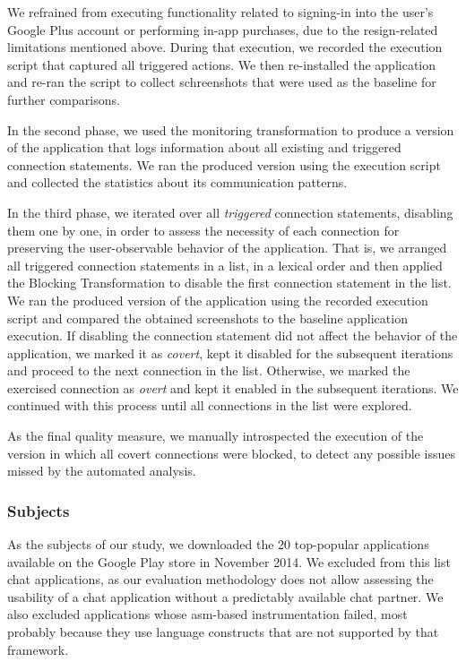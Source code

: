 We refrained from executing functionality related to signing-in into the user's Google Plus account or performing in-app purchases, due to the resign-related limitations mentioned above.
During that execution, we recorded the execution script that captured all triggered actions. 
We then re-installed the application %
and re-ran the script to collect schreenshots that were used as the baseline for further comparisons. 

In the second phase, we used the monitoring transformation to produce a version of the %
application that logs information about all existing and triggered connection statements. We ran the produced version using the execution script and collected the statistics about its communication patterns.  

In the third phase, we iterated over all \emph{triggered} connection statements, disabling them one by one, in order to assess
the necessity of each connection for preserving the user-observable behavior of the application. 
That is, we arranged all triggered connection statements in a list, in a lexical order and then applied the Blocking Transformation to disable the first connection statement in the list.   
We ran the produced version of the application using the recorded execution script and compared the obtained screenshots to the baseline application execution. If disabling the connection statement did not affect the behavior of the application, we marked it as \emph{covert}, kept it disabled for the subsequent iterations and proceed to the next connection in the list.
Otherwise, we marked the exercised connection as \emph{overt} and kept it enabled in the subsequent iterations.
We continued with this process until all connections in the list were explored.

As the final quality measure, we manually introspected the execution of the version in which all covert connections
were blocked, to detect any  possible issues missed by the automated analysis.

\subsubsection{Subjects}
As the subjects of our study, we downloaded the 20 top-popular applications available on the Google Play store in November 2014. 
We excluded from this list chat applications, as our evaluation methodology does not allow assessing the usability of a chat application without a predictably available chat partner. 
We also excluded applications whose asm-based instrumentation failed, most probably because they use language constructs that are not supported by that framework.

